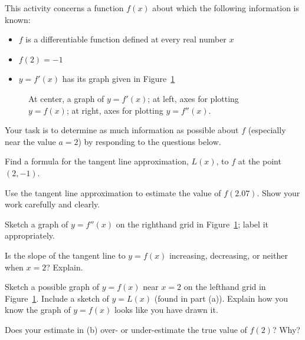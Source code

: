 \begin{activity} \label{A:1.8.2}
This activity concerns a function $f(x)$ about which the following information is known:
\begin{itemize}
	\item $f$ is a differentiable function defined at every real number $x$
	\item $f(2) = -1$
	\item $y = f'(x)$ has its graph given in Figure~\ref{F:1.8.Act2}
\end{itemize}
\begin{figure}[h]
\begin{center}
\end{center}
\caption{At center, a graph of $y = f'(x)$; at left, axes for plotting $y = f(x)$; at right, axes for plotting $y = f''(x)$.} \label{F:1.8.Act2}
\end{figure}

Your task is to determine as much information as possible about $f$ (especially near the value $a = 2$) by responding to the questions below.
\ba
	\item Find a formula for the tangent line approximation, $L(x)$, to $f$ at the point $(2,-1)$.
	\item Use the tangent line approximation to estimate the value of $f(2.07)$.  Show your work carefully and clearly.
	\item Sketch a graph of $y = f''(x)$ on the righthand grid in Figure~\ref{F:1.8.Act2}; label it appropriately.
	\item Is the slope of the tangent line to $y = f(x)$ increasing, decreasing, or neither when $x = 2$?  Explain.
	\item Sketch a possible graph of $y = f(x)$ near $x = 2$ on the lefthand grid in Figure~\ref{F:1.8.Act2}.  Include a sketch of $y=L(x)$ (found in part (a)).  Explain how you know the graph of $y = f(x)$ looks like you have drawn it.   
	\item Does your estimate in (b) over- or under-estimate the true value of $f(2)$?  Why?
\ea
\end{activity}
